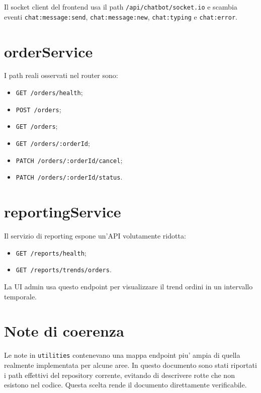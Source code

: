 Il socket client del frontend usa il path \texttt{/api/chatbot/socket.io} e scambia eventi \texttt{chat:message:send}, \texttt{chat:message:new}, \texttt{chat:typing} e \texttt{chat:error}.

\section{orderService}

I path reali osservati nel router sono:

\begin{itemize}
\item \texttt{GET /orders/health};
\item \texttt{POST /orders};
\item \texttt{GET /orders};
\item \texttt{GET /orders/:orderId};
\item \texttt{PATCH /orders/:orderId/cancel};
\item \texttt{PATCH /orders/:orderId/status}.
\end{itemize}

\section{reportingService}

Il servizio di reporting espone un'API volutamente ridotta:

\begin{itemize}
\item \texttt{GET /reports/health};
\item \texttt{GET /reports/trends/orders}.
\end{itemize}

La UI admin usa questo endpoint per visualizzare il trend ordini in un intervallo temporale.

\section{Note di coerenza}

Le note in \texttt{utilities} contenevano una mappa endpoint piu' ampia di quella realmente implementata per alcune aree. In questo documento sono stati riportati i path effettivi del repository corrente, evitando di descrivere rotte che non esistono nel codice. Questa scelta rende il documento direttamente verificabile.
